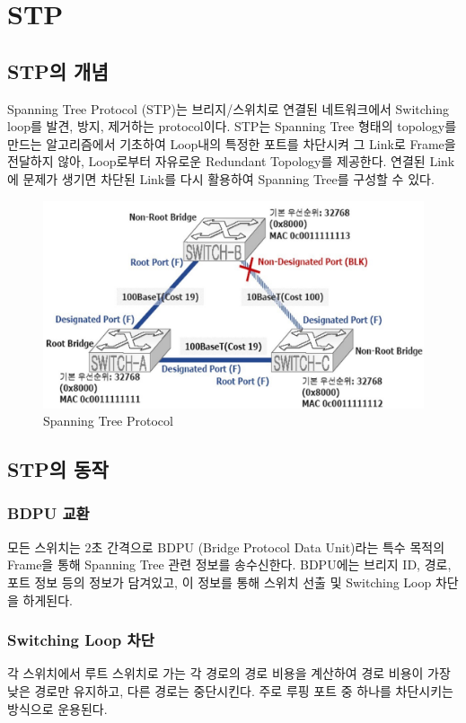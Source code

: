 \section{STP}
\subsection{STP의 개념}
    Spanning Tree Protocol (STP)는 브리지/스위치로 연결된 네트워크에서 Switching loop를 발견, 방지, 제거하는 protocol이다.  STP는 Spanning Tree 형태의 topology를 만드는 알고리즘에서 기초하여 Loop내의  특정한 포트를 차단시켜 그 Link로 Frame을 전달하지 않아, Loop로부터 자유로운 Redundant Topology를 제공한다. 연결된 Link에 문제가 생기면 차단된 Link를 다시 활용하여 Spanning Tree를 구성할 수 있다. \\
    \vspace{-4mm}
    \begin{figure}[!h]\centering
		\includegraphics[width=.65\textwidth]{image/week06/2-1.png}
		\caption{\small Spanning Tree Protocol}
		\vspace{-10pt}
    \end{figure}
    
\subsection{STP의 동작}
    \subsubsection*{BDPU 교환}
    모든 스위치는 2초 간격으로 BDPU (Bridge Protocol Data Unit)라는 특수 목적의 Frame을 통해 Spanning Tree 관련 정보를 송수신한다. BDPU에는 브리지 ID, 경로, 포트 정보 등의 정보가 담겨있고, 이 정보를 통해 스위치 선출 및 Switching Loop 차단을 하게된다. \\
    \subsubsection*{Switching Loop 차단}
    각 스위치에서 루트 스위치로 가는 각 경로의 경로 비용을 계산하여 경로 비용이 가장 낮은 경로만 유지하고, 다른 경로는 중단시킨다. 주로 루핑 포트 중 하나를 차단시키는 방식으로 운용된다. \\
    
